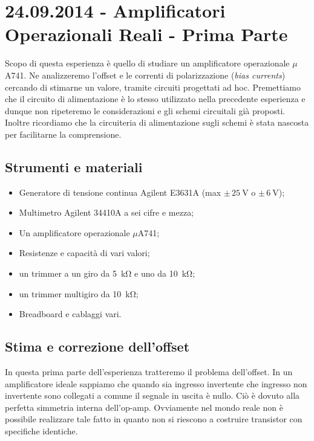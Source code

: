 \section{24.09.2014 - Amplificatori Operazionali Reali - Prima Parte}

Scopo di questa esperienza è quello di studiare un amplificatore operazionale $\mu$A741.
Ne analizzeremo l'offset e le correnti di polarizzazione (\textit{bias currents}) cercando di stimarne un valore, tramite circuiti progettati ad hoc.
Premettiamo che il circuito di alimentazione è lo stesso utilizzato nella precedente esperienza e dunque non ripeteremo le considerazioni e gli schemi circuitali già proposti.
Inoltre ricordiamo che la circuiteria di alimentazione sugli schemi è stata nascosta per facilitarne la comprensione.

\subsection{Strumenti e materiali}

\begin{itemize} [noitemsep]
\item Generatore di tensione continua Agilent E3631A (max $\pm \, \SI{25}{\volt}$ o $\pm \, \SI{6}{\volt}$);
\item Multimetro Agilent 34410A a sei cifre e mezza;
\item Un amplificatore operazionale $\mu$A741;
\item Resistenze e capacità di vari valori;
\item un trimmer a un giro da \SI{5}{\kilo\ohm} e uno da \SI{10}{\kilo\ohm};
\item un trimmer multigiro da \SI{10}{\kilo\ohm};
\item Breadboard e cablaggi vari.
\end{itemize}

\subsection{Stima e correzione dell'offset}
\label{par2:offset}

In questa prima parte dell'esperienza tratteremo il problema dell'offset. In un amplificatore ideale sappiamo che quando sia ingresso invertente che ingresso non invertente sono collegati a comune il segnale in uscita è nullo. Ciò è dovuto alla perfetta simmetria interna dell'op-amp. Ovviamente nel mondo reale non è possibile realizzare tale fatto in quanto non si riescono a costruire transistor con specifiche identiche. 

